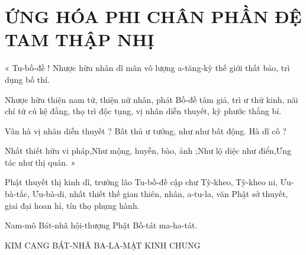 	\section*{ỨNG HÓA PHI CHÂN PHẦN ĐỆ TAM THẬP NHỊ}
	
	« Tu-bồ-đề ! Nhược hữu nhân dĩ mãn vô lượng a-tăng-kỳ thế giới thất bảo, trì dụng bố thí.
	
	Nhược hữu thiện nam tử, thiện nữ nhân, phát Bồ-đề tâm giả, trì ư thử kinh, nãi chí tứ cú kệ đẳng, thọ trì độc tụng, vị nhân diễn thuyết, kỳ phước thắng bỉ. 
	
	Vân hà vị nhân diễn thuyết ? Bất thủ ư tướng, như như bất động. Hà dĩ cố ?
	
	Nhất thiết hữu vi pháp,Như mộng, huyễn, bào, ảnh ;Như lộ diệc như điển,Ưng tác như thị quán. »
	
	Phật thuyết thị kinh dĩ, trưởng lão Tu-bồ-đề cập chư Tỳ-kheo, Tỳ-kheo ni, Ưu-bà-tắc, Ưu-bà-di, nhất thiết thế gian thiên, nhân, a-tu-la, văn Phật sở thuyết, giai đại hoan hỉ, tín thọ phụng hành.
	
	Nam-mô Bát-nhã hội-thượng Phật Bồ-tát ma-ha-tát. 
	
	\begin{center}
		\vspace{1em}
		KIM CANG BÁT-NHÃ BA-LA-MẬT KINH CHUNG
	\end{center}